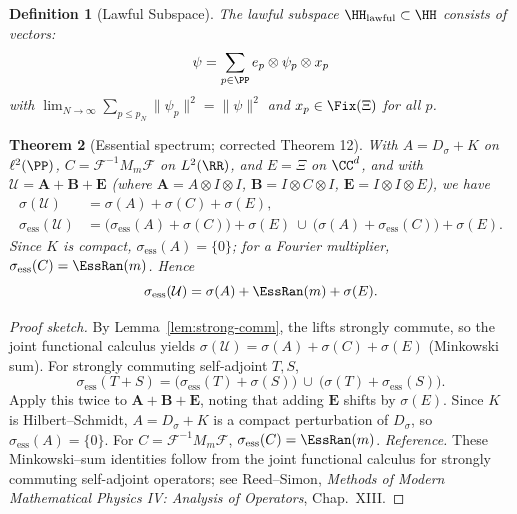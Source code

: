 \documentclass[12]{amsart}
\newtheorem{theorem}{Theorem}
\theoremstyle{plain}
\newtheorem{definition}[theorem]{Definition}
\begin{document}
\begin{definition}[Lawful Subspace]
The lawful subspace $\HH_{\text{lawful}} \subset \HH$ consists of vectors:
\[
\psi = \sum_{p \in \PP} e_p \otimes \psi_p \otimes x_p
\]
with $\lim_{N\to\infty} \sum_{p \leq p_N} \|\psi_p\|^2 = \|\psi\|^2$ and $x_p \in \Fix(\Xi)$ for all $p$.
\end{definition}


\begin{theorem}[Essential spectrum; corrected Theorem 12]\label{thm:ess-12}
With $A=D_\sigma+K$ on $\ell^2(\PP)$, $C=\mathcal F^{-1} M_m \mathcal F$ on $L^2(\RR)$,
and $E=\Xi$ on $\CC^d$, and with $\mathcal U=\mathbf A+\mathbf B+\mathbf E$
(where $\mathbf A=A\otimes I\otimes I$, $\mathbf B=I\otimes C\otimes I$, $\mathbf E=I\otimes I\otimes E$), we have
\begin{align*}
\sigma(\mathcal U) &= \sigma(A)+\sigma(C)+\sigma(E),\\
\sigma_{\mathrm{ess}}(\mathcal U)
&= \big(\sigma_{\mathrm{ess}}(A)+\sigma(C)\big)+\sigma(E)\ \cup\
\big(\sigma(A)+\sigma_{\mathrm{ess}}(C)\big)+\sigma(E).
\end{align*}
Since $K$ is compact, $\sigma_{\mathrm{ess}}(A)=\{0\}$; for a Fourier multiplier, $\sigma_{\mathrm{ess}}(C)=\EssRan(m)$. Hence
\[
\sigma_{\mathrm{ess}}(\mathcal U)=\sigma(A)+\EssRan(m)+\sigma(E).
\]
\end{theorem}

\begin{proof}[Proof sketch]
By Lemma~\ref{lem:strong-comm}, the lifts strongly commute, so the joint functional calculus yields
$\sigma(\mathcal U)=\sigma(A)+\sigma(C)+\sigma(E)$ (Minkowski sum).
For strongly commuting self-adjoint $T,S$,
\[
\sigma_{\mathrm{ess}}(T+S)
=\big(\sigma_{\mathrm{ess}}(T)+\sigma(S)\big)\ \cup\ \big(\sigma(T)+\sigma_{\mathrm{ess}}(S)\big).
\]
Apply this twice to $\mathbf A+\mathbf B+\mathbf E$, noting that adding $\mathbf E$ shifts by $\sigma(E)$.
Since $K$ is Hilbert–Schmidt, $A=D_\sigma+K$ is a compact perturbation of $D_\sigma$, so
$\sigma_{\mathrm{ess}}(A)=\{0\}$. For $C=\mathcal F^{-1}M_m\mathcal F$, $\sigma_{\mathrm{ess}}(C)=\EssRan(m)$.
\emph{Reference.} These Minkowski–sum identities follow from the joint functional calculus for
strongly commuting self-adjoint operators; see Reed–Simon,
\emph{Methods of Modern Mathematical Physics IV: Analysis of Operators}, Chap.~XIII.
\end{proof}
\end{document}
